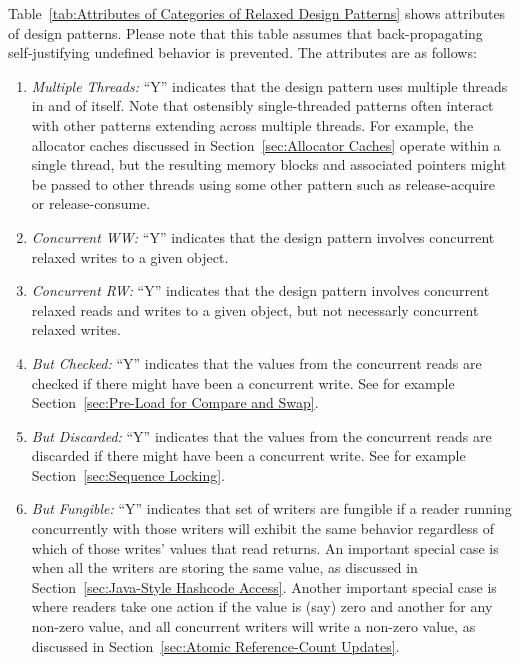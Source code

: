 \documentclass[10]{article}
\begin{document}
Table~\ref{tab:Attributes of Categories of Relaxed Design Patterns}
shows attributes of design patterns.
Please note that this table assumes that back-propagating self-justifying
undefined behavior is prevented.
The attributes are as follows:

\begin{enumerate}
\item	\emph{Multiple Threads:}  ``Y'' indicates that the design pattern
	uses multiple threads in and of itself.
	Note that ostensibly single-threaded patterns often interact
	with other patterns extending across multiple threads.
	For example, the allocator caches discussed in
	Section~\ref{sec:Allocator Caches}
	operate within a single thread, but the resulting memory blocks
	and associated pointers might be passed to other threads using
	some other pattern such as release-acquire or release-consume.
\item	\emph{Concurrent WW:}  ``Y'' indicates that the design pattern
	involves concurrent relaxed writes to a given object.
\item	\emph{Concurrent RW:}  ``Y'' indicates that the design pattern
	involves concurrent relaxed reads and writes to a given object,
	but not necessarly concurrent relaxed writes.
\item	\emph{But Checked:}  ``Y'' indicates that the values from
	the concurrent reads are checked if there might have been a
	concurrent write.  See for example
	Section~\ref{sec:Pre-Load for Compare and Swap}.
\item	\emph{But Discarded:}  ``Y'' indicates that the values from
	the concurrent reads are discarded if there might have been a
	concurrent write.
	See for example Section~\ref{sec:Sequence Locking}.
\item	\emph{But Fungible:}  ``Y'' indicates that set of writers are
	fungible if a reader running concurrently with those writers will
	exhibit the same behavior regardless of which of those writes'
	values that read returns.
	An important special case is when all the writers are storing
	the same value, as discussed in
	Section~\ref{sec:Java-Style Hashcode Access}.
	Another important special case is where readers take one
	action if the value is (say) zero and another for any
	non-zero value, and all concurrent writers will write
	a non-zero value, as discussed in
	Section~\ref{sec:Atomic Reference-Count Updates}.


\end{enumerate}
\end{document}
